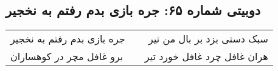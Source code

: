 \begin{center}
\section*{دوبیتی شماره ۶۵: جره بازی بدم رفتم به نخجیر}
\label{sec:065}
\begin{longtable}{l p{0.5cm} r}
جره بازی بدم رفتم به نخجیر
&&
سبک دستی بزد بر بال من تیر
\\
برو غافل مچر در کوهساران
&&
هران غافل چرد غافل خورد تیر
\\
\end{longtable}
\end{center}
